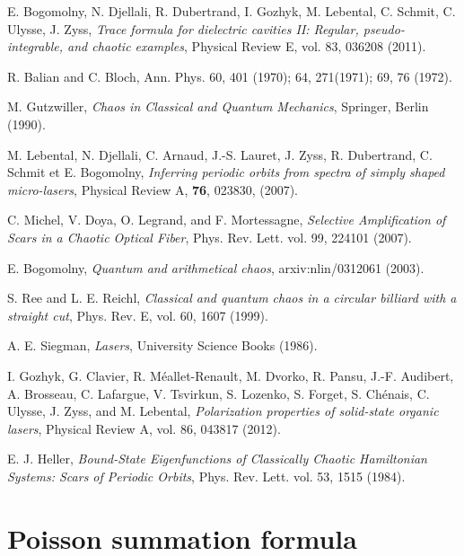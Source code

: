 \documentclass[10pt]{iopart}
\begin{document}
\begin{thebibliography}{10}
 E. Bogomolny, N. Djellali, R. Dubertrand, I. Gozhyk, M. Lebental, C. Schmit, C. Ulysse, J. Zyss, \emph{Trace formula for dielectric cavities II: Regular, pseudo-integrable, and chaotic examples}, Physical Review E, vol. 83, 036208 (2011).

R. Balian and C. Bloch, Ann. Phys. 60, 401 (1970); 64, 271(1971); 69, 76 (1972).

 M. Gutzwiller, \emph{Chaos in Classical and Quantum Mechanics}, Springer, Berlin (1990).

 M. Lebental, N. Djellali, C. Arnaud, J.-S. Lauret, J. Zyss,
R. Dubertrand, C. Schmit et E. Bogomolny, \emph{Inferring periodic
orbits from spectra of simply shaped micro-lasers}, Physical Review
A, {\bf 76}, 023830, (2007).

 C. Michel, V. Doya, O. Legrand, and F. Mortessagne, \emph{Selective Amplification of Scars in a Chaotic Optical Fiber}, Phys. Rev. Lett. vol. 99, 224101 (2007).

 E. Bogomolny, \emph{Quantum and arithmetical chaos}, arxiv:nlin/0312061 (2003).

 S. Ree and L. E. Reichl, \emph{Classical and quantum chaos in a circular billiard with a straight cut}, Phys. Rev. E, vol. 60, 1607 (1999).

 A. E. Siegman, \emph{Lasers}, University Science Books (1986).

 I. Gozhyk, G. Clavier, R. M\'eallet-Renault, M. Dvorko, R. Pansu, J.-F. Audibert, A. Brosseau, C. Lafargue, V. Tsvirkun, S. Lozenko, S. Forget, S. Ch\'enais, C. Ulysse, J. Zyss, and M. Lebental,
\emph{Polarization properties of solid-state organic lasers},
Physical Review A, vol. 86, 043817 (2012).

 E. J. Heller, \emph{Bound-State Eigenfunctions of Classically Chaotic Hamiltonian Systems: Scars of Periodic Orbits}, Phys. Rev. Lett. vol. 53, 1515 (1984).


\end{thebibliography}



\appendix



\section{Poisson summation formula}\label{sec:annexe-Poisson}
\end{document}
